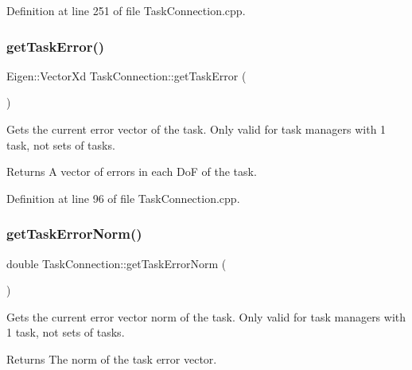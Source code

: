 Definition at line 251 of file Task\+Connection.\+cpp.

\hypertarget{classocra__recipes_1_1TaskConnection_ab968ad0f0a818f240eed58f1780f8586}{}\label{classocra__recipes_1_1TaskConnection_ab968ad0f0a818f240eed58f1780f8586} 
\subsubsection{\texorpdfstring{get\+Task\+Error()}{getTaskError()}}
{\footnotesize\ttfamily Eigen\+::\+Vector\+Xd Task\+Connection\+::get\+Task\+Error (\begin{DoxyParamCaption}{ }\end{DoxyParamCaption})}

Gets the current error vector of the task.  Only valid for task managers with 1 task, not sets of tasks.

\begin{DoxyReturn}{Returns}
A vector of errors in each DoF of the task. 
\end{DoxyReturn}


Definition at line 96 of file Task\+Connection.\+cpp.

\hypertarget{classocra__recipes_1_1TaskConnection_a2639764e4b7fe55aa29dce82a2268b3a}{}\label{classocra__recipes_1_1TaskConnection_a2639764e4b7fe55aa29dce82a2268b3a} 
\subsubsection{\texorpdfstring{get\+Task\+Error\+Norm()}{getTaskErrorNorm()}}
{\footnotesize\ttfamily double Task\+Connection\+::get\+Task\+Error\+Norm (\begin{DoxyParamCaption}{ }\end{DoxyParamCaption})}

Gets the current error vector norm of the task.  Only valid for task managers with 1 task, not sets of tasks.

\begin{DoxyReturn}{Returns}
The norm of the task error vector. 
\end{DoxyReturn}


